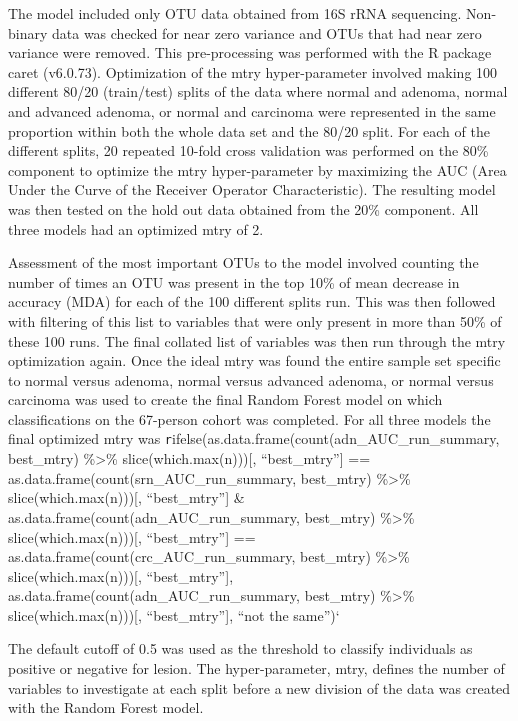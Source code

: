 \documentclass[12pt,]{article}
\begin{document}
The model included only OTU data obtained from 16S rRNA sequencing.
Non-binary data was checked for near zero variance and OTUs that had
near zero variance were removed. This pre-processing was performed with
the R package caret (v6.0.73). Optimization of the mtry hyper-parameter
involved making 100 different 80/20 (train/test) splits of the data
where normal and adenoma, normal and advanced adenoma, or normal and
carcinoma were represented in the same proportion within both the whole
data set and the 80/20 split. For each of the different splits, 20
repeated 10-fold cross validation was performed on the 80\% component to
optimize the mtry hyper-parameter by maximizing the AUC (Area Under the
Curve of the Receiver Operator Characteristic). The resulting model was
then tested on the hold out data obtained from the 20\% component. All
three models had an optimized mtry of 2.

Assessment of the most important OTUs to the model involved counting the
number of times an OTU was present in the top 10\% of mean decrease in
accuracy (MDA) for each of the 100 different splits run. This was then
followed with filtering of this list to variables that were only present
in more than 50\% of these 100 runs. The final collated list of
variables was then run through the mtry optimization again. Once the
ideal mtry was found the entire sample set specific to normal versus
adenoma, normal versus advanced adenoma, or normal versus carcinoma was
used to create the final Random Forest model on which classifications on
the 67-person cohort was completed. For all three models the final
optimized mtry was
\texttt{r}ifelse(as.data.frame(count(adn\_AUC\_run\_summary, best\_mtry)
\%\textgreater{}\% slice(which.max(n))){[}, ``best\_mtry''{]} ==
as.data.frame(count(srn\_AUC\_run\_summary, best\_mtry)
\%\textgreater{}\% slice(which.max(n))){[}, ``best\_mtry''{]} \&
as.data.frame(count(adn\_AUC\_run\_summary, best\_mtry)
\%\textgreater{}\% slice(which.max(n))){[}, ``best\_mtry''{]} ==
as.data.frame(count(crc\_AUC\_run\_summary, best\_mtry)
\%\textgreater{}\% slice(which.max(n))){[}, ``best\_mtry''{]},
as.data.frame(count(adn\_AUC\_run\_summary, best\_mtry)
\%\textgreater{}\% slice(which.max(n))){[}, ``best\_mtry''{]}, ``not the
same'')`

The default cutoff of 0.5 was used as the threshold to classify
individuals as positive or negative for lesion. The hyper-parameter,
mtry, defines the number of variables to investigate at each split
before a new division of the data was created with the Random Forest
model.
\end{document}
